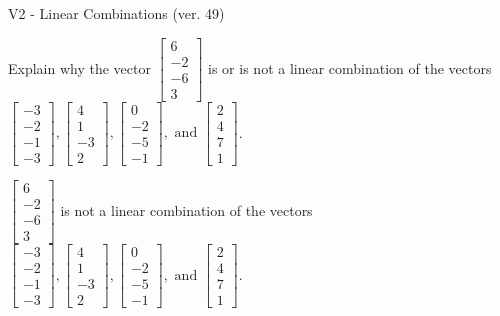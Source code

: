 \begin{exercise}
  \begin{exerciseTitle}V2 - Linear Combinations (ver. 49)\end{exerciseTitle}
  \begin{exerciseStatement}
    Explain why the vector \(\left[\begin{array}{c}
6 \\
-2 \\
-6 \\
3
\end{array}\right]\)  is or is not a linear 
	combination of the vectors \(\left[\begin{array}{c}
-3 \\
-2 \\
-1 \\
-3
\end{array}\right] , \left[\begin{array}{c}
4 \\
1 \\
-3 \\
2
\end{array}\right] , \left[\begin{array}{c}
0 \\
-2 \\
-5 \\
-1
\end{array}\right] , \text{ and } \left[\begin{array}{c}
2 \\
4 \\
7 \\
1
\end{array}\right]\).
	


  \end{exerciseStatement}
  \begin{exerciseAnswer}
   \(\left[\begin{array}{c}
6 \\
-2 \\
-6 \\
3
\end{array}\right]\) 
  	 is not  
	a linear combination of the vectors \(\left[\begin{array}{c}
-3 \\
-2 \\
-1 \\
-3
\end{array}\right] , \left[\begin{array}{c}
4 \\
1 \\
-3 \\
2
\end{array}\right] , \left[\begin{array}{c}
0 \\
-2 \\
-5 \\
-1
\end{array}\right] , \text{ and } \left[\begin{array}{c}
2 \\
4 \\
7 \\
1
\end{array}\right]\).


\end{exerciseAnswer}
\end{exercise}
